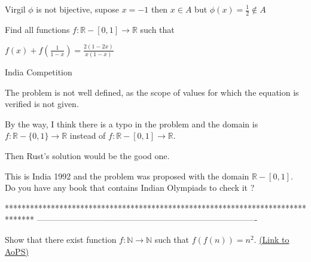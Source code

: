 \begin{mysolution}

Virgil $ \phi$ is not bijective, supose $ x =-1$ then $ x\in A$ but $ \phi(x) =\frac{1}{2}\notin A$
\end{mysolution}



\begin{mysolution}
	\begin{tcolorbox}Find all functions $ f:\mathbb{R}-[0,1]\to\mathbb{R}$ such that 

$ f(x)+f\left(\frac{1}{1-x}\right) =\frac{2(1-2x)}{x(1-x)}$

India Competition\end{tcolorbox}

The problem is not well defined, as the scope of values for which the equation is verified is not given.

By the way, I think there is a typo in the problem and the domain is $ f:\mathbb{R}-\{0,1\}\to\mathbb{R}$ instead of $ f:\mathbb{R}-[0,1]\to\mathbb{R}$.

Then Rust's solution would be the good one.
\end{mysolution}



\begin{mysolution}
This is India 1992 and the problem was proposed with the domain $ \mathbb{R}-[0,1]$. Do you have any book that contains Indian Olympiads to check it ?
\end{mysolution}
*******************************************************************************
-------------------------------------------------------------------------------

\begin{problem}
	Show that there exist function $ f: \mathbb N \to \mathbb N$ such that $ f(f(n)) = n^{2}$.
	\flushright \href{https://artofproblemsolving.com/community/c6h162930}{(Link to AoPS)}
\end{problem}



